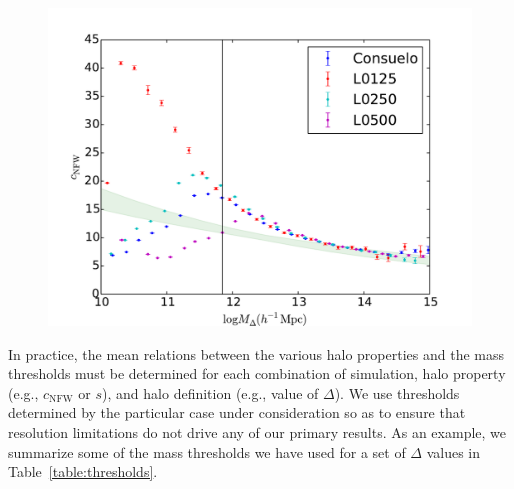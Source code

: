 \documentclass[usenatbib,usegraphicx,letterpaper]{mn2e}
\begin{document}
\begin{figure}
\centering
\includegraphics[width=.5\textwidth]{masscut_cnfw_d200.pdf}
\caption{}
\label{fig:srelation}
\end{figure}

In practice, the mean relations between the various halo properties and the mass thresholds must be determined 
for each combination of simulation, halo property (e.g., $c_{\mathrm{NFW}}$ or $s$), and halo definition (e.g., value 
of $\Delta$). We use thresholds determined by the particular case under consideration so as to ensure that resolution 
limitations do not drive any of our primary results. As an example, we summarize some of the mass thresholds we have 
used for a set of $\Delta$ values in Table~\ref{table:thresholds}.
\end{document}
